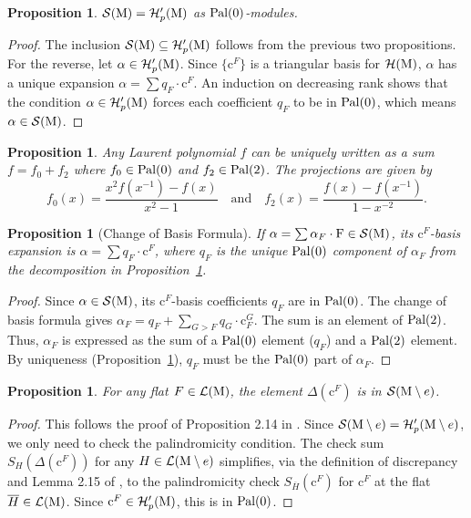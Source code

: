 \documentclass[11pt]{article}
\newcommand{\calH}{\mathcal{H}}
\newcommand{\calS}{\mathcal{S}}
\newcommand{\M}{\normalfont\text{M}}
\newcommand{\Ebasis}[1]{\mathrm{#1}}
\newcommand{\Cbasis}[1]{\mathrm{c}^{#1}}
\newcommand{\CbasisSub}[2]{\mathrm{c}^{#1}_{#2}}
\newcommand{\pal}{\normalfont\text{Pal}}
\newtheorem{proposition}[theorem]{Proposition}
\theoremstyle{remark}
\begin{document}
\begin{proposition}\label{prop:SisHp}
    \(\calS(\M) = \calH'_p(\M)\) as \(\pal(0)\)-modules.
\end{proposition}
\begin{proof}
    The inclusion \(\calS(\M) \subseteq \calH'_p(\M)\) follows from the previous two propositions. For the reverse, let \(\alpha \in \calH'_p(\M)\). Since \(\{\Cbasis{F}\}\) is a triangular basis for \(\calH(\M)\), \(\alpha\) has a unique expansion \(\alpha = \sum q_F \cdot \Cbasis{F}\). An induction on decreasing rank shows that the condition \(\alpha \in \calH'_p(\M)\) forces each coefficient \(q_F\) to be in \(\pal(0)\), which means \(\alpha \in \calS(\M)\).
\end{proof}

\begin{proposition}\label{prop:LPDecomposition}
    Any Laurent polynomial \(f\) can be uniquely written as a sum \(f = f_0 + f_2\) where \(f_0 \in \pal(0)\) and \(f_2 \in \pal(2)\). The projections are given by
    \[ f_0(x) = \frac{x^2 f(x^{-1}) - f(x)}{x^2 - 1} \quad \text{and} \quad f_2(x) = \frac{f(x) - f(x^{-1})}{1 - x^{-2}}. \]
\end{proposition}

\begin{proposition}[Change of Basis Formula]\label{prop:changeofbasis}
    If \(\alpha = \sum \alpha_F \cdot\Ebasis{F} \in \calS(\M)\), its \(\Cbasis{F}\)-basis expansion is \(\alpha = \sum q_F \cdot\Cbasis{F}\), where \(q_F\) is the unique \(\pal(0)\) component of \(\alpha_F\) from the decomposition in Proposition~\ref{prop:LPDecomposition}.
\end{proposition}
\begin{proof}
    Since \(\alpha \in \calS(\M)\), its \(\Cbasis{F}\)-basis coefficients \(q_F\) are in \(\pal(0)\). The change of basis formula gives \(\alpha_F = q_F + \sum_{G > F} q_G \cdot \CbasisSub{G}{F}\). The sum is an element of \(\pal(2)\). Thus, \(\alpha_F\) is expressed as the sum of a \(\pal(0)\) element (\(q_F\)) and a \(\pal(2)\) element. By uniqueness (Proposition~\ref{prop:LPDecomposition}), \(q_F\) must be the \(\pal(0)\) part of \(\alpha_F\).
\end{proof}

\begin{proposition}\label{prop:DeltaFInS}
    For any flat \(F \in \mathcal{L}(\M)\), the element \(\Delta(\Cbasis{F})\) is in \(\calS(\M \setminus e)\).
\end{proposition}
\begin{proof}
    This follows the proof of Proposition 2.14 in \cite{BV20}. Since \(\calS(\M \setminus e) = \calH'_p(\M \setminus e)\), we only need to check the palindromicity condition. The check sum \(S_H(\Delta(\Cbasis{F}))\) for any \(H \in \mathcal{L}(\M \setminus e)\) simplifies, via the definition of discrepancy and Lemma 2.15 of \cite{BV20}, to the palindromicity check \(S_{\overline{H}}(\Cbasis{F})\) for \(\Cbasis{F}\) at the flat \(\overline{H} \in \mathcal{L}(\M)\). Since \(\Cbasis{F} \in \calH'_p(\M)\), this is in \(\pal(0)\).
\end{proof}
\end{document}
